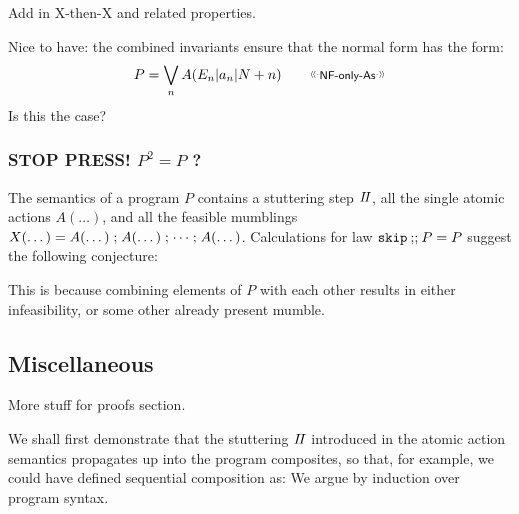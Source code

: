 Add in X-then-X and related properties.

Nice to have:
the combined invariants ensure that the normal form
has the form:
\[
  P = \bigvee_n A(E_n|a_n|N+n)  \qquad \elabel{NF-only-As}
\]
Is this the case?

\subsubsection{STOP PRESS! $P^2=P$ ?}

The semantics of a program $P$
contains a stuttering step $I\!I$,
all the single atomic actions $A(\dots)$,
and all the feasible mumblings
$X(\dots) = A(\dots) \seq A(\dots) \seq \dots \seq A(\dots)$.
Calculations for law $\texttt{skip}\mathbin{;\!;} P = P$ suggest the following conjecture:
\begin{center}
\end{center}
This is because combining elements of $P$ with each other results
in either infeasibility, or some other already present mumble.
\newpage
\subsection{Miscellaneous}

More stuff for proofs section.


We shall first demonstrate that the stuttering $I\!I$
introduced in the atomic action semantics
propagates up into the program composites,
so that, for example, we could have defined sequential composition
as:
We argue by induction over program syntax.

